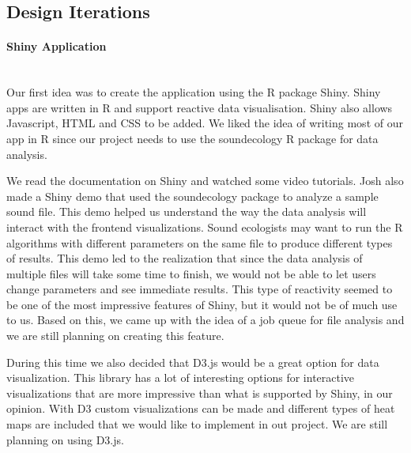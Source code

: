 \subsection{Design Iterations}

\paragraph{Shiny Application} \mbox{}\\[\paragraphheaderspace]
Our first idea was to create the application using the R package Shiny. Shiny apps are written in R and support reactive data visualisation. Shiny also allows Javascript, HTML and CSS to be added. We liked the idea of writing most of our app in R since our project needs to use the soundecology R package for data analysis.\par
We read the documentation on Shiny and watched some video tutorials. Josh also made a Shiny demo that used the soundecology package to analyze a sample sound file. This demo helped us understand the way the data analysis will interact with the frontend visualizations. Sound ecologists may want to run the R algorithms with different parameters on the same file to produce different types of results. This demo led to the realization that since the data analysis of multiple files will take some time to finish, we would not be able to let users change parameters and see immediate results. This type of reactivity seemed to be one of the most impressive features of Shiny, but it would not be of much use to us. Based on this, we came up with the idea of a job queue for file analysis and we are still planning on creating this feature.\par
During this time we also decided that D3.js would be a great option for data visualization. This library has a lot of interesting options for interactive visualizations that are more impressive than what is supported by Shiny, in our opinion. With D3 custom visualizations can be made and different types of heat maps are included that we would like to implement in out project. We are still planning on using D3.js.\par

